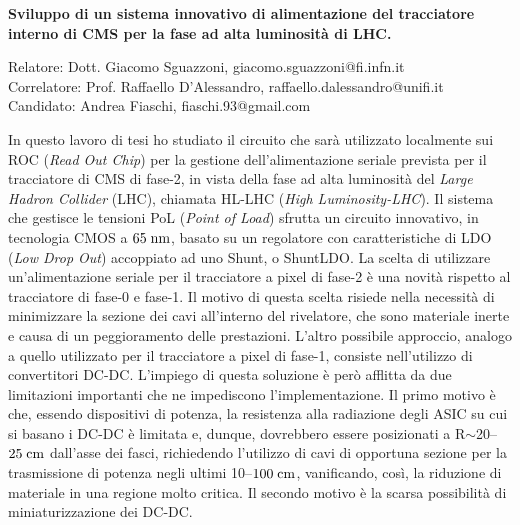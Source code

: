 \documentclass[a4paper,12pt,italian]{article}
\begin{document}

\pagestyle{plain}
\noindent

\begin{center}
\textbf{Sviluppo di un sistema innovativo di alimentazione del tracciatore interno di CMS per la fase ad alta luminosità di LHC.}
\end{center}
\begin{center}
Relatore: Dott. Giacomo Sguazzoni, giacomo.sguazzoni@fi.infn.it \\
Correlatore: Prof. Raffaello D'Alessandro, raffaello.dalessandro@unifi.it \\
Candidato: Andrea Fiaschi, fiaschi.93@gmail.com
\end{center}


In questo lavoro di tesi ho studiato il circuito che sarà utilizzato localmente sui ROC (\textit{Read Out Chip}) per la gestione dell'alimentazione seriale prevista per il tracciatore di CMS di fase-2, in vista della fase ad alta luminosità del \textit{Large Hadron Collider} (LHC), chiamata HL-LHC (\textit{High Luminosity-LHC}). 
Il sistema che gestisce le tensioni PoL (\textit{Point of Load}) sfrutta un circuito innovativo, in tecnologia CMOS a $65 \rm \; nm$, basato su un regolatore con caratteristiche di LDO (\textit{Low Drop Out}) accoppiato ad uno Shunt, o ShuntLDO. 
La scelta di utilizzare un'alimentazione seriale per il tracciatore a pixel di fase-2 è una novità rispetto al tracciatore di fase-0 e fase-1.
Il motivo di questa scelta risiede nella necessità di minimizzare la sezione dei cavi all'interno del rivelatore, che sono materiale inerte e causa di un peggioramento delle prestazioni. 
L'altro possibile approccio, analogo a quello utilizzato per il tracciatore a pixel di fase-1, consiste nell'utilizzo di convertitori DC-DC. L'impiego di questa soluzione è però afflitta da due limitazioni importanti che ne impediscono l'implementazione. 
Il primo motivo è che, essendo dispositivi di potenza, la resistenza alla radiazione degli ASIC su cui si basano i DC-DC è limitata e, dunque, dovrebbero essere posizionati a R$\sim$20--$25 \rm \; cm$ dall'asse dei fasci, richiedendo l'utilizzo di cavi di opportuna sezione per la trasmissione di potenza negli ultimi 10--$100 \rm \; cm$, vanificando, così, la riduzione di materiale in una regione molto critica. 
Il secondo motivo è la scarsa possibilità di miniaturizzazione dei DC-DC. 
\end{document}
